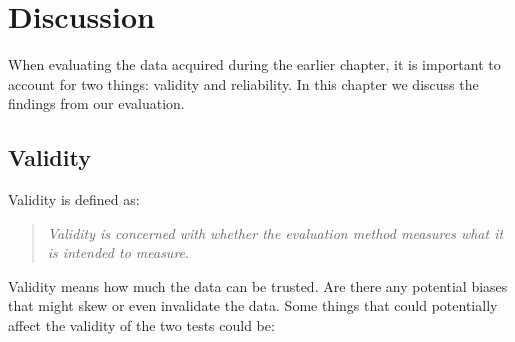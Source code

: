 \chapter{Discussion}
When evaluating the data acquired during the earlier chapter, it is important to account for two things: validity and reliability. In this chapter we discuss the findings from our evaluation.
\section*{Validity}
	Validity is defined as:\\
	\begin{quote}
		\textit{Validity is concerned with whether the evaluation method measures what it is intended to measure}\cite[p.~442~Box~13.3]{interactionDesign}.\\
	\end{quote}
	Validity means how much the data can be trusted. Are there any potential biases that might skew or even invalidate the data. Some things that could potentially affect the validity of the two tests could be:\\
